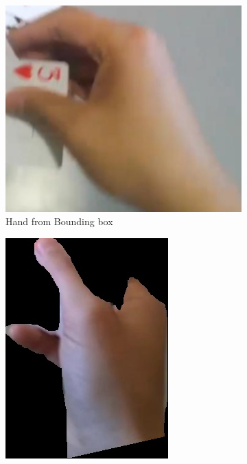 \begin{figure}
    \centering
    \begin{subfigure}[b]{0.3 \textwidth}
        \centering
        \includegraphics[width=\textwidth]{images/hand/2170.jpg}
        \caption{Hand from Bounding box}
        \label{fig:handBoundeed}
    \end{subfigure}
    \hfill
    \begin{subfigure}[b]{0.3\textwidth}
        \centering
        \includegraphics[width=\textwidth]{images/masked/hand231.jpg}

\end{subfigure}
\end{figure}
